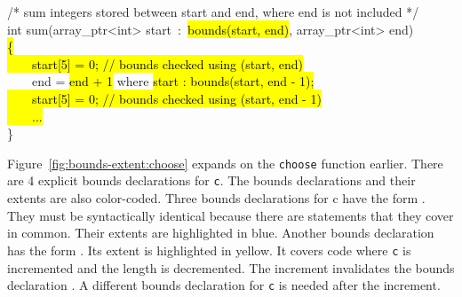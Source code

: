 \begin{tt}
/* sum integers stored between start and end, where end is not included */ \\  
int sum(array\_ptr<int> start~:~\hl{bounds(start, end)}, array\_ptr<int> end)\\
\hl{\{\\
~~~~start[5] = 0; // bounds checked using (start, end)}\\
\mbox{~~~~end} = \hl{end + 1} where \hl{start : bounds(start, end - 1);\\
~~~~start[5] = 0; // bounds checked using (start, end - 1)\\
\mbox{~~~~}...\\
}\}
\end{tt}

Figure~\ref{fig:bounds-extent:choose} expands on the \texttt{choose} function earlier. 
There are 4 explicit bounds declarations for \texttt{c}. The bounds declarations
and their extents are also color-coded. Three bounds declarations for c
have the form . They must be syntactically
identical because there are statements that they cover in common. Their
extents are highlighted in blue.  Another bounds declaration has
the form .   Its extent is highlighted
in yellow. It covers code where \texttt{c} is incremented and the 
length is decremented.  The increment invalidates the bounds declaration
.  A different bounds declaration for \texttt{c}
is needed after the increment.


